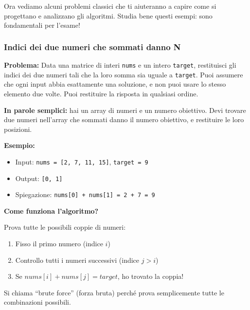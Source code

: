 \documentclass[a4paper, 11pt]{article}
\theoremstyle{definition}
\theoremstyle{remark}
\theoremstyle{remark}
\newenvironment{nota}{%
	\begin{tcolorbox}[
		colback=codebg,
		colframe=primary,
		fonttitle=\bfseries,
		title=Nota,
		left=6pt, right=6pt, top=4pt, bottom=4pt
		]
	}{%
	\end{tcolorbox}
}
\begin{document}
	\begin{softnote}
		Ora vediamo alcuni problemi classici che ti aiuteranno a capire come si progettano e analizzano gli algoritmi. Studia bene questi esempi: sono fondamentali per l'esame!
	\end{softnote}
	
	\subsubsection*{Indici dei due numeri che sommati danno N}
	\textbf{Problema:} Data una matrice di interi \texttt{nums} e un intero \texttt{target}, restituisci gli indici dei due numeri tali che la loro somma sia uguale a \texttt{target}. Puoi assumere che ogni input abbia esattamente una soluzione, e non puoi usare lo stesso elemento due volte. Puoi restituire la risposta in qualsiasi ordine.
	
	\begin{nota}
		\textbf{In parole semplici:} hai un array di numeri e un numero obiettivo. Devi trovare due numeri nell'array che sommati danno il numero obiettivo, e restituire le loro posizioni.
		
		\textbf{Esempio:}
		\begin{itemize}
			\item Input: \texttt{nums = [2, 7, 11, 15]}, \texttt{target = 9}
			\item Output: \texttt{[0, 1]}
			\item Spiegazione: \texttt{nums[0] + nums[1] = 2 + 7 = 9}
		\end{itemize}
	\end{nota}
	
	\begin{algorithm}[H]
		\caption{twoSum (Brute Force)}
	\end{algorithm}
	
	\begin{softnote}
		\textbf{Come funziona l'algoritmo?}
		
		Prova tutte le possibili coppie di numeri:
		\begin{enumerate}
			\item Fisso il primo numero (indice $i$)
			\item Controllo tutti i numeri successivi (indice $j > i$)
			\item Se $nums[i] + nums[j] = target$, ho trovato la coppia!
		\end{enumerate}
		
		Si chiama ``brute force'' (forza bruta) perché prova semplicemente tutte le combinazioni possibili.
	\end{softnote}
	
\end{document}
